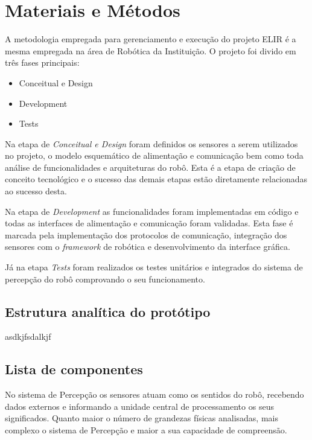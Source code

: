 \chapter{Materiais e Métodos}
\label{chap:mat}

A metodologia empregada para gerenciamento e execução do projeto ELIR é a mesma empregada na área de Robótica da Instituição. O projeto foi divido em três fases principais:

\begin{itemize}
	\item Conceitual e Design
	\item Development
	\item Tests
\end{itemize}

Na etapa de \textit{Conceitual e Design} foram definidos os sensores a serem utilizados no projeto, o modelo esquemático de alimentação e comunicação bem como toda análise de funcionalidades e arquiteturas do robô. Esta é a etapa de criação de conceito tecnológico e o sucesso das demais etapas estão diretamente relacionadas ao sucesso desta.

Na etapa de \textit{Development} as funcionalidades foram implementadas em código e todas as interfaces de alimentação e comunicação foram validadas. Esta fase é marcada pela implementação dos protocolos de comunicação, integração dos sensores com o \textit{framework} de robótica e desenvolvimento da interface gráfica.

Já na etapa \textit{Tests} foram realizados os testes unitários e integrados do sistema de percepção do robô comprovando o seu funcionamento.


\section{Estrutura analítica do protótipo}
\label{ssec:pbs}
asdkjfsdalkjf

\section{Lista de componentes}
\label{ssec:list}

No sistema de Percepção os sensores atuam como os sentidos do robô, recebendo dados externos e informando a unidade central de processamento os seus significados. Quanto maior o número de grandezas físicas analisadas, mais complexo o sistema de Percepção e maior a sua capacidade de compreensão. 

